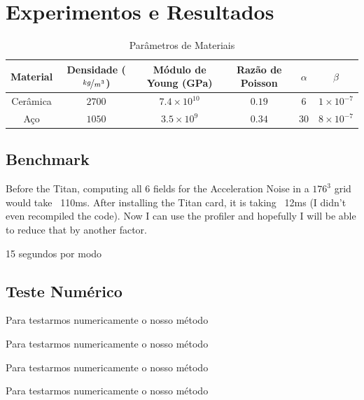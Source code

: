 \chapter{Experimentos e Resultados}

\begin{table}[ht]
\begin{center}
\begin{tabular}{c|ccccc}
Material & Densidade ($\nicefrac{kg}{m^3}$) & Módulo de Young (GPa) & Razão de Poisson & $\alpha$ & $\beta$\\
\hline Cerâmica & $2700$ & $7.4 \times 10^{10}$ & $0.19$ & $6$ & $1 \times 10^{-7}$\\
Aço & $1050$ & $3.5 \times 10^9$ & $0.34$ & $30$ & $8 \times 10^{-7}$\\
\end{tabular}
\end{center}
\caption{Parâmetros de Materiais}\label{tab:material_parameters}
\end{table}

\section{Benchmark}
Before the Titan, computing all 6 fields for the Acceleration Noise in a $176^3$ grid would take ~110ms. After installing the Titan card, it is taking ~12ms (I didn't even recompiled the code). Now I can use the profiler and hopefully I will be able to reduce that by another factor.

15 segundos por modo


\section{Teste Numérico}

Para testarmos numericamente o nosso método

Para testarmos numericamente o nosso método

Para testarmos numericamente o nosso método

Para testarmos numericamente o nosso método


